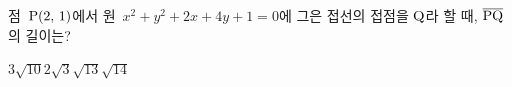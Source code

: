 점~$\mathrm{P}(2,\,1)$에서 원~$x^2+y^2+2x+4y+1=0$에 그은 접선의 접점을 $\mathrm{Q}$라 할 때, $\overline{\mathrm{PQ}}$의 길이는?
\begin{choices32}{$3$}{$\sqrt{10}$}{$2\sqrt{3}$}{$\sqrt{13}$}{$\sqrt{14}$}\end{choices32}
